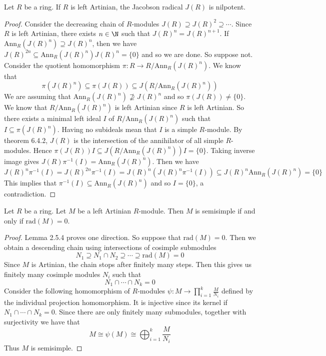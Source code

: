\documentclass[a4paper]{article}
\begin{document}
\begin{prp}{}{} Let $R$ be a ring. If $R$ is left Artinian, the Jacobson radical $J(R)$ is nilpotent. \tcbline
\begin{proof}
Consider the decreasing chain of $R$-modules $J(R)\supseteq J(R)^2\supseteq\cdots$. Since $R$ is left Artinian, there exists $n\in\N$ such that $J(R)^n=J(R)^{n+1}$. If $\text{Ann}_R(J(R)^n)\supseteq J(R)^n$, then we have $J(R)^{2n}\subseteq\text{Ann}_R(J(R)^n)J(R)^n=\{0\}$ and so we are done. So suppose not. Consider the quotient homomorphism $\pi:R\to R/\text{Ann}_R(J(R)^n)$. We know that $$\pi(J(R)^n)\subseteq\pi(J(R))\subseteq J(R/\text{Ann}_R(J(R)^n))$$ We are assuming that $\text{Ann}_R(J(R)^n)\not\supseteq J(R)^n$ and so $\pi(J(R))\neq\{0\}$. We know that $R/\text{Ann}_R(J(R)^n)$ is left Artinian since $R$ is left Artinian. So there exists a minimal left ideal $I$ of $R/\text{Ann}_R(J(R)^n)$ such that $I\subseteq\pi(J(R)^n)$. Having no subideals mean that $I$ is a simple $R$-module. By theorem 6.4.2, $J(R)$ is the intersection of the annihilator of all simple $R$-modules. Hence $\pi(J(R))I\subseteq J(R/\text{Ann}_R(J(R)^n))I=\{0\}$. Taking inverse image gives $J(R)\pi^{-1}(I)=\text{Ann}_R(J(R)^n)$. Then we have $$J(R)^n\pi^{-1}(I)=J(R)^{2n}\pi^{-1}(I)=J(R)^n(J(R)^n\pi^{-1}(I))\subseteq J(R)^n\text{Ann}_R(J(R)^n)=\{0\}$$ This implies that $\pi^{-1}(I)\subseteq\text{Ann}_R(J(R)^n)$ and so $I=\{0\}$, a contradiction. 
\end{proof}
\end{prp}

\begin{prp}{}{} Let $R$ be a ring. Let $M$ be a left Artinian $R$-module. Then $M$ is semisimple if and only if $\text{rad}(M)=0$. \tcbline
\begin{proof}
Lemma 2.5.4 proves one direction. So suppose that $\text{rad}(M)=0$. Then we obtain a descending chain using intersections of cosimple submodules $$N_1\supseteq N_1\cap N_2\supseteq\cdots\supseteq\text{rad}(M)=0$$ Since $M$ is Artinian, the chain stops after finitely many steps. Then this gives us finitely many cosimple modules $N_i$ such that $$N_1\cap\cdots\cap N_k=0$$ Consider the following homomorphism of $R$-modules $\psi:M\to\prod_{i=1}^k\frac{M}{N_i}$ defined by the individual projection homomorphism. It is injective since its kernel if $N_1\cap\cdots\cap N_k=0$. Since there are only finitely many submodules, together with surjectivity we have that $$M\cong\psi(M)\cong\bigoplus_{i=1}^k\frac{M}{N_i}$$ Thus $M$ is semisimple. 
\end{proof}
\end{prp}
\end{document}
